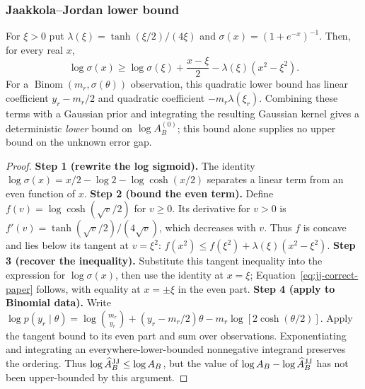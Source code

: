 \subsubsection{Jaakkola--Jordan lower bound}
\begin{proposition}
\label{prop:jj-paper}
For $\xi>0$ put $\lambda(\xi)=\tanh(\xi/2)/(4\xi)$ and $\sigma(x)=(1+e^{-x})^{-1}$. Then, for every real $x$,
\begin{equation}
\log\sigma(x)\ge\log\sigma(\xi)+\frac{x-\xi}{2}
-\lambda(\xi)(x^2-\xi^2).
\label{eq:jj-correct-paper}
\end{equation}
For a $\operatorname{Binom}(m_r,\sigma(\theta))$ observation, this quadratic lower bound has linear coefficient $y_r-m_r/2$ and quadratic coefficient $-m_r\lambda(\xi_r)$. Combining these terms with a Gaussian prior and integrating the resulting Gaussian kernel gives a deterministic \emph{lower} bound on $\log A^{(0)}_B$; this bound alone supplies no upper bound on the unknown error gap.
\end{proposition}
\begin{proof}
\textbf{Step 1 (rewrite the log sigmoid).} The identity $\log\sigma(x)=x/2-\log2-\log\cosh(x/2)$ separates a linear term from an even function of $x$.
\textbf{Step 2 (bound the even term).} Define $f(v)=\log\cosh(\sqrt v/2)$ for $v\ge0$. Its derivative for $v>0$ is $f'(v)=\tanh(\sqrt v/2)/(4\sqrt v)$, which decreases with $v$. Thus $f$ is concave and lies below its tangent at $v=\xi^2$: $f(x^2)\le f(\xi^2)+\lambda(\xi)(x^2-\xi^2)$.
\textbf{Step 3 (recover the inequality).} Substitute this tangent inequality into the expression for $\log\sigma(x)$, then use the identity at $x=\xi$; Equation~\eqref{eq:jj-correct-paper} follows, with equality at $x=\pm\xi$ in the even part.
\textbf{Step 4 (apply to Binomial data).} Write $\log p(y_r\mid\theta)=\log\binom{m_r}{y_r}+(y_r-m_r/2)\theta-m_r\log[2\cosh(\theta/2)]$. Apply the tangent bound to its even part and sum over observations. Exponentiating and integrating an everywhere-lower-bounded nonnegative integrand preserves the ordering. Thus $\log\widehat A_B^{\rm JJ}\le\log A_B$, but the value of $\log A_B-\log\widehat A_B^{\rm JJ}$ has not been upper-bounded by this argument.
\end{proof}

